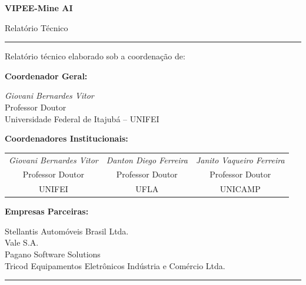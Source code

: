 \begin{titlepage}\thispagestyle{empty}
    \centering\rmfamily{}
    \vspace*{0.5cm}
    {\fontsize{26}{32}\bfseries\selectfont VIPEE-Mine AI\par}
    \vspace{0.3cm}
    {\Large Relatório Técnico\par}
    \vspace{0.4cm}
    \rule{\textwidth}{0.4pt}\par
    \vspace{0.2cm}
    \vspace{0.3cm}
    Relatório técnico elaborado sob a coordenação de:\par\vspace{0.4cm}
    {\bfseries Coordenador Geral:}\par\vspace{2pt}
    \textit{Giovani Bernardes Vitor}\\
    Professor Doutor\\
    Universidade Federal de Itajubá -- UNIFEI\par\vspace{0.5cm}
    {\bfseries Coordenadores Institucionais:}\par\vspace{2pt}
    \begin{tabular}{ccc}
        \textit{Giovani Bernardes Vitor} & \textit{Danton Diego Ferreira} & \textit{Janito Vaqueiro Ferreira} \\
        Professor Doutor & Professor Doutor & Professor Doutor \\
        UNIFEI & UFLA & UNICAMP \\
    \end{tabular}\par\vspace{0.5cm}
    {\bfseries Empresas Parceiras:}\par\vspace{2pt}
    Stellantis Automóveis Brasil Ltda.\\
    Vale S.A.\\
    Pagano Software Solutions\\
    Tricod Equipamentos Eletrônicos Indústria e Comércio Ltda.\par
    \vspace{0.3cm}
    \rule{\textwidth}{0.4pt}\par

\end{titlepage}

